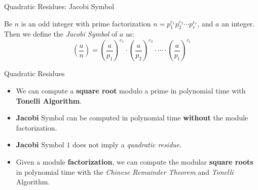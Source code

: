 \documentclass{beamer}
\begin{document}
\begin{frame}{Quadratic Residues: Jacobi Symbol}
\begin{definition}
	Be $n$ is an odd integer with prime factorization $n = p_1^{e_1} p_2^{e_2} \cdots p_r^{e_r}$, and $a$ an integer. Then we define the \textit{Jacobi Symbol} of $a$ as:
	\[\left( \dfrac{a}{n} \right) = \left( \dfrac{a}{p_1} \right)^{e_1} \cdot \left( \dfrac{a}{p_2} \right)^{e_2} \cdot \cdots \cdot \left( \dfrac{a}{p_t} \right)^{e_t}\]
\end{definition}
\end{frame}


\begin{frame}{Quadratic Residues}
\begin{itemize}
	\item We can compute a \textbf{square root} modulo a prime in polynomial time with \textbf{Tonelli Algorithm}.
	\item \textbf{Jacobi} Symbol can be computed in polynomial time \textbf{without} the module factorization.
	\item \textbf{Jacobi} Symbol $1$ does not imply a \textit{quadratic residue}.
	\item Given a module \textbf{factorization}, we can compute the modular \textbf{square roots} in polynomial time with the \textit{Chinese Remainder Theorem} and \textit{Tonelli} Algorithm.
\end{itemize}
\end{frame}
\end{document}
